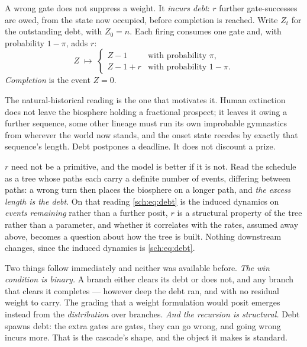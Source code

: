 \begin{definition}\label{sch:def:debt}
A wrong gate does not suppress a weight. It \emph{incurs debt}: $r$
further gate-successes are owed, from the state now occupied, before
completion is reached. Write $Z_t$ for the outstanding debt, with
$Z_0=n$. Each firing consumes one gate and, with probability $1-\pi$,
adds $r$:
\begin{equation}\label{sch:eq:debt}
Z\;\longmapsto\;
\begin{cases}
Z-1 & \text{with probability }\pi,\\
Z-1+r & \text{with probability }1-\pi .
\end{cases}
\end{equation}
\emph{Completion} is the event $Z=0$.
\end{definition}

The natural-historical reading is the one that motivates it. Human
extinction does not leave the biosphere holding a fractional prospect;
it leaves it owing a further sequence, some other lineage must run
its own improbable gymnastics from wherever the world now stands, and
the onset state recedes by exactly that sequence's length. Debt
postpones a deadline. It does not discount a prize.

$r$ need not be a primitive, and the model is better if it is not. Read
the schedule as a tree whose paths each carry a definite number of
events, differing between paths: a wrong turn then places the biosphere
on a longer path, and \emph{the excess length is the debt}. On that
reading \eqref{sch:eq:debt} is the induced dynamics on \emph{events
remaining} rather than a further posit, $r$ is a structural property of
the tree rather than a parameter, and whether it correlates with the
rates, assumed away above, becomes a question about how the tree
is built. Nothing downstream changes, since the induced dynamics is
\eqref{sch:eq:debt}.

Two things follow immediately and neither was available before. \emph{The win condition is binary.} A branch either clears its debt or
does not, and any branch that clears it completes --- however deep the
debt ran, and with no residual weight to carry. The grading that a
weight formulation would posit emerges instead from the
\emph{distribution} over branches. \emph{And the recursion is structural.} Debt spawns debt: the extra
gates are gates, they can go wrong, and going wrong incurs more. That is
the cascade's shape, and the object it makes is standard.

